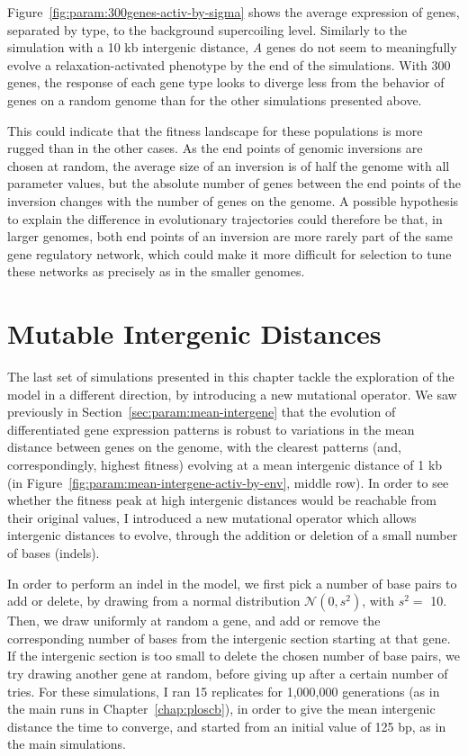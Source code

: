 Figure~\ref{fig:param:300genes-activ-by-sigma} shows the average expression of genes, separated by type, to the background supercoiling level.
Similarly to the simulation with a 10 kb intergenic distance, \emph{A} genes do not seem to meaningfully evolve a relaxation-activated phenotype by the end of the simulations.
With 300 genes, the response of each gene type looks to diverge less from the behavior of genes on a random genome than for the other simulations presented above.

This could indicate that the fitness landscape for these populations is more rugged than in the other cases.
As the end points of genomic inversions are chosen at random, the average size of an inversion is of half the genome with all parameter values, but the absolute number of genes between the end points of the inversion changes with the number of genes on the genome.
A possible hypothesis to explain the difference in evolutionary trajectories could therefore be that, in larger genomes, both end points of an inversion are more rarely part of the same gene regulatory network, which could make it more difficult for selection to tune these networks as precisely as in the smaller genomes.

\FloatBlock


\section{Mutable Intergenic Distances}
\label{sec:param:evolve-intergene}

The last set of simulations presented in this chapter tackle the exploration of the model in a different direction, by introducing a new mutational operator.
We saw previously in Section~\ref{sec:param:mean-intergene} that the evolution of differentiated gene expression patterns is robust to variations in the mean distance between genes on the genome, with the clearest patterns (and, correspondingly, highest fitness) evolving at a mean intergenic distance of 1 kb (in Figure~\ref{fig:param:mean-intergene-activ-by-env}, middle row).
In order to see whether the fitness peak at high intergenic distances would be reachable from their original values, I introduced a new mutational operator which allows intergenic distances to evolve, through the addition or deletion of a small number of bases (indels).

In order to perform an indel in the model, we first pick a number of base pairs to add or delete, by drawing from a normal distribution $\mathcal{N}(0, s^2)$, with $s^2 = $ 10.
Then, we draw uniformly at random a gene, and add or remove the corresponding number of bases from the intergenic section starting at that gene.
If the intergenic section is too small to delete the chosen number of base pairs, we try drawing another gene at random, before giving up after a certain number of tries.
For these simulations, I ran 15 replicates for 1,000,000 generations (as in the main runs in Chapter~\ref{chap:ploscb}), in order to give the mean intergenic distance the time to converge, and started from an initial value of 125 bp, as in the main simulations.

